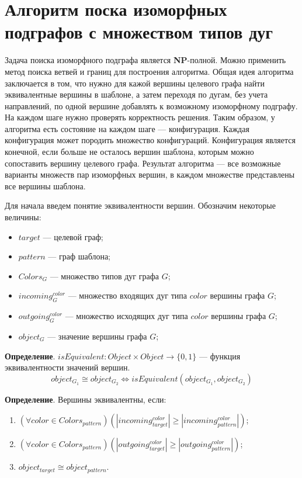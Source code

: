 \section{Алгоритм поска изоморфных подграфов с множеством типов дуг}

Задача поиска изоморфного подграфа является \textbf{NP}-полной.
Можно применить метод поиска ветвей и границ для построения алгоритма.
Общая идея алгоритма заключается в том,
что нужно для кажой вершины целевого графа найти эквивалентные вершины в шаблоне,
а затем переходя по дугам, без учета направлений,
по одной вершине добавлять к возможному изоморфному подграфу.
На каждом шаге нужно проверять корректность решения.
Таким образом, у алгоритма есть состояние на каждом шаге --- конфигурация.
Каждая конфигурация может породить множество конфигураций.
Конфигурация является конечной, если больше не осталось вершин шаблона,
которым можно сопоставить вершину целевого графа.
Результат алгоритма --- все возможные варианты множеств пар изоморфных вершин,
в каждом множестве представлены все вершины шаблона.

Для начала введем понятие эквивалентности вершин.
Обозначим некоторые величины:
\begin{itemize}
\item $target$ --- целевой граф;
\item $pattern$ --- граф шаблона;
\item $Colors_G$ --- множество типов дуг графа $G$;
\item $incoming^{color}_G$ --- множество входящих дуг типа $color$ вершины графа $G$;
\item $outgoing^{color}_G$ --- множество исходящих дуг типа $color$ вершины графа $G$;
\item $object_G$ --- значение вершины графа $G$;
\end{itemize}

\textbf{Определение}. $isEquivalent: Object \times Object \to \{ 0, 1 \}$ ---
функция эквивалентности значений вершин.
%
$$object_{G_1} \cong object_{G_2} \iff isEquivalent(object_{G_1}, object_{G_2})$$

\textbf{Определение}. Вершины эквивалентны, если:
\begin{enumerate}
\item $( \forall color \in Colors_{pattern} ) ( |incoming^{color}_{target}| \ge |incoming^{color}_{pattern}| )$;
\item $( \forall color \in Colors_{pattern} ) ( |outgoing^{color}_{target}| \ge |outgoing^{color}_{pattern}| )$;
\item $object_{target} \cong object_{pattern}$.
\end{enumerate}

